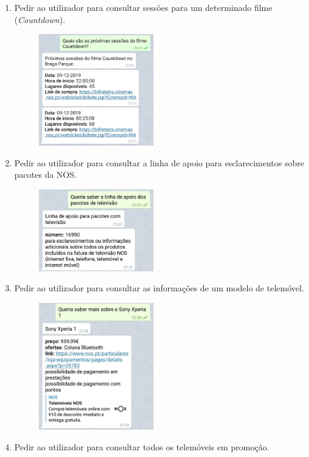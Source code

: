 \documentclass[11pt, a4paper]{article}
\begin{document}
\begin{appendices}
\begin{enumerate}
\begin{figure}[H]
    \end{figure}
    \item Pedir ao utilizador para consultar sessões para um determinado filme (\textit{Countdown}).
    \begin{figure}[H]
        \centering
        \includegraphics[width=5cm]{images/guiaoP/7.png}
    \end{figure}
    \item Pedir ao utilizador para consultar a linha de apoio para esclarecimentos sobre pacotes da NOS.
    \begin{figure}[H]
        \centering
        \includegraphics[width=5cm]{images/guiaoP/8.png}
    \end{figure}
    \item Pedir ao utilizador para consultar as informações de um modelo de telemóvel.
    \begin{figure}[H]
        \centering
        \includegraphics[width=5cm]{images/guiaoP/9.png}
    \end{figure}
    \item Pedir ao utilizador para consultar todos os telemóveis em promoção.

\end{enumerate}
\end{appendices}
\end{document}
